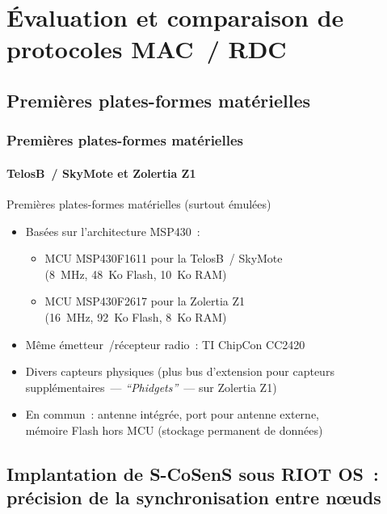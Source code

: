 \documentclass[10pt,c]{beamer}
\newcommand{\lang}[1]{\textit{#1}}
\begin{document}

\section[Protocoles MAC~/RDC]
        {\'Evaluation et comparaison de protocoles MAC~/ RDC}


\subsection{Premières plates-formes matérielles}

\begin{frame}[label=pfMSP1]
\frametitle{Premières plates-formes matérielles}
\framesubtitle{TelosB~/ SkyMote et Zolertia Z1}

\vspace{-0.25cm}
\begin{block}{Premières plates-formes matérielles (surtout émulées)}
\begin{itemize}
\item Basées sur l'architecture MSP430~:
  \begin{itemize}
  \item MCU MSP430F1611 pour la TelosB~/ SkyMote \\
         {\small (8~MHz, 48~Ko Flash, 10~Ko RAM)}
  \item MCU MSP430F2617 pour la Zolertia Z1 \\
         {\small (16~MHz, 92~Ko Flash, 8~Ko RAM)}
  \end{itemize}
\item Même émetteur~/récepteur radio~: TI ChipCon CC2420
\item Divers capteurs physiques {\small (plus bus d'extension pour capteurs
      supplémentaires~--- \lang{``Phidgets''}~--- sur Zolertia Z1)}
\item En commun~: antenne intégrée, port pour antenne externe, \\
       mémoire Flash hors MCU (stockage permanent de données)
\end{itemize}
\end{block}

\end{frame}


\subsection[Implantation de S-CoSenS sous RIOT OS]
           {Implantation de S-CoSenS sous RIOT OS~:
            précision de la synchronisation entre n{\oe}uds}
\end{document}
